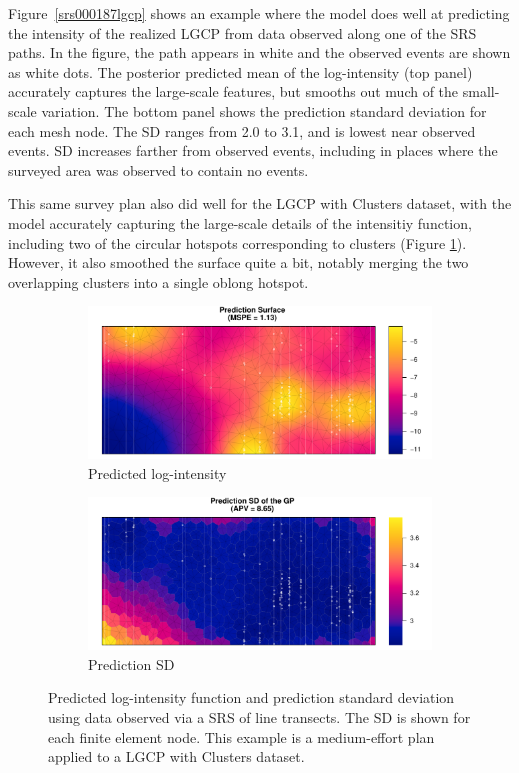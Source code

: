 \documentclass[review]{elsarticle}
\begin{document}
Figure~\ref{srs000187lgcp} shows an example where the model does well at predicting
the intensity of the realized LGCP from data observed along one of the SRS
paths. In the figure, the path appears in white and the observed events are
shown as white dots. The posterior predicted mean of the log-intensity (top
panel) accurately captures the large-scale features, but smooths out much of
the small-scale variation. The bottom panel shows the prediction standard
deviation for each mesh node. The SD ranges from 2.0 to 3.1, and is lowest
near observed events. SD increases farther from observed events, including
in places where the surveyed area was observed to contain no events.

This same survey plan also did well for the LGCP with Clusters dataset, with
the model accurately capturing the large-scale details of the intensitiy
function, including two of the circular hotspots corresponding to clusters
(Figure \ref{lambdasrs000187clust}). However, it also smoothed the surface
quite a bit, notably merging the two overlapping clusters into a single oblong
hotspot.

\begin{figure}

\begin{subfigure}{5in}
\includegraphics[width=5in]{../graphics/lambda-SRS000187-Cluster000004.pdf}
\caption{Predicted log-intensity}
\label{lambdasrs000187clust}
\end{subfigure}

\begin{subfigure}{5in}
\includegraphics[width=5in]{../graphics/lambdaSD-SRS000187-Cluster000004.pdf}
\caption{Prediction SD}
\label{sdsrs000187clust}
\end{subfigure}

\caption{Predicted log-intensity function and prediction standard deviation
using data observed via a SRS of line transects. The SD is shown for each
finite element node. This example is a medium-effort plan applied to a
LGCP with Clusters dataset.}
\label{srs000187clust}
\end{figure}
\end{document}
